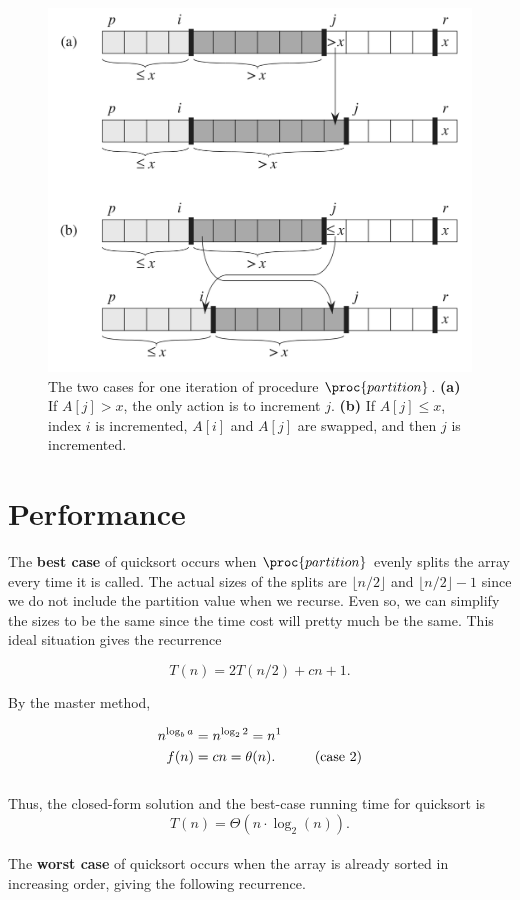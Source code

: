 \documentclass{article}
\begin{document}
\begin{figure}[!ht]
\includegraphics[scale=0.45]{partition_cases}
\caption{
    The two cases for one iteration of procedure $\proc{partition}$. 
    \textbf{(a)} If $A[j] > x$, the only action is to increment $j$.
    \textbf{(b)} If $A[j] \leq x$, index $i$ is incremented, $A[i]$ and $A[j]$ are swapped, and then $j$ is incremented.
}
\label{fig:quicksort3}
\end{figure}

\newpage

\section*{Performance}
The \textbf{best case} of quicksort occurs when $\proc{partition}$ evenly splits the array every time it is called. The actual sizes of the splits are $\lfloor n/2 \rfloor$ and $\lfloor n/2 \rfloor - 1$ since we do not include the partition value when we recurse. Even so, we can simplify the sizes to be the same since the time cost will pretty much be the same. This ideal situation gives the recurrence

\begin{equation*}
    T(n) = 2T(n/2) + cn + 1.
\end{equation*}

By the master method,

\begin{equation*}
\begin{split}
    n^{\log_b{a}} & = n^{\log_2{2}} = n^1 \\
    f(n) & = cn = \theta{(n)}. \text{\hspace{10mm}(case 2)}
\end{split}
\end{equation*}
\\
Thus, the closed-form solution and the best-case running time for quicksort is
\begin{equation*}
    T(n) = \Theta{(n \cdot \log_2{(n)})}.
\end{equation*}
\\
The \textbf{worst case} of quicksort occurs when the array is already sorted in increasing order, giving the following recurrence.
\end{document}
